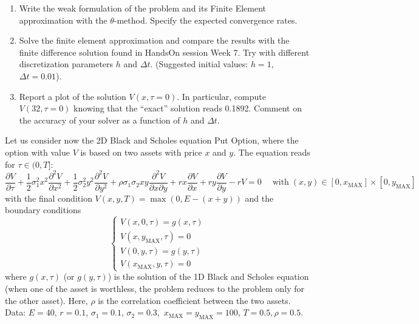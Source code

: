 \documentclass{article}
\newcommand{\tmname}[1]{\textsc{#1}}
\newcommand{\tmop}[1]{\ensuremath{\operatorname{#1}}}
\newenvironment{enumeratenumeric}{\begin{enumerate}[1.] }{\end{enumerate}}
{\theorembodyfont{\rmfamily\small}\newtheorem{problem}{Problem}}
\begin{document}
\begin{problem}
\begin{enumeratenumeric}
    \item Write the weak formulation of the problem and its Finite Element
    approximation with the $\theta$-method. Specify the expected convergence
    rates.
    
    \item Solve the finite element approximation and compare the results with
    the finite difference solution found in HandsOn session Week 7. Try with
    different discretization parameters $h$ and $\Delta t$. (Suggested initial
    values: $h = 1$, $\Delta t = 0.01$).
    
    \item Report a plot of the solution $V (x, \tau = 0)$. In particular,
    compute {\tmname{$V (32, \tau = 0)$}} knowing that the ``exact'' solution
    reads 0.1892. Comment on the accuracy of your solver as a function of $h$
    and $\Delta t$.
  \end{enumeratenumeric}
  
\end{problem}

\begin{problem}
  Let us consider now the 2D Black and Scholes equation Put Option, where the
  option with value $V$ is based on two assets with price $x$ and $y$. The
  equation reads for $\tau \in (0, T] :$
  \[ \dfrac{\partial V}{\partial \tau} + \dfrac{1}{2} \sigma_1^2 x^2
     \dfrac{\partial^2 V}{\partial x^2} + \dfrac{1}{2} \sigma_2^2 y^2
     \dfrac{\partial^2 V}{\partial y^2} + \rho \sigma_1 \sigma_2 x y
     \dfrac{\partial^2 V}{\partial x \partial y} + r x \dfrac{\partial
     V}{\partial x} + r y \dfrac{\partial V}{\partial y} - r V = 0 \quad
     \tmop{with} (x, y) \in [0, x_{\tmop{MAX}}] \times [0, y_{\tmop{MAX}}] \]
  with the final condition $V (x, y, T) = \max (0, E - (x + y))$ and the
  boundary conditions
  \[ \left\{\begin{array}{l}
       V (x, 0, \tau) = g (x, \tau)\\
       V (x, y_{\tmop{MAX}}, \tau) = 0\\
       V (0, y, \tau) = g (y, \tau)\\
       V (x_{\tmop{MAX}}, y, \tau) = 0
     \end{array}\right. \]
  where $g (x, \tau)$ (or $g (y, \tau)$) is the solution of the 1D Black and
  Scholes equation (when one of the asset is worthless, the problem reduces to
  the problem only for the other asset). Here, $\rho$ is the correlation
  coefficient between the two assets. Data: $E = 40$, $r = 0.1$, $\sigma_1 =
  0.1$, $\sigma_2 = 0.3,$ $x_{\tmop{MAX}} = y_{\tmop{MAX}} = 100$, $T = 0.5,
  \rho = 0.5$.
\end{problem}
\end{document}
